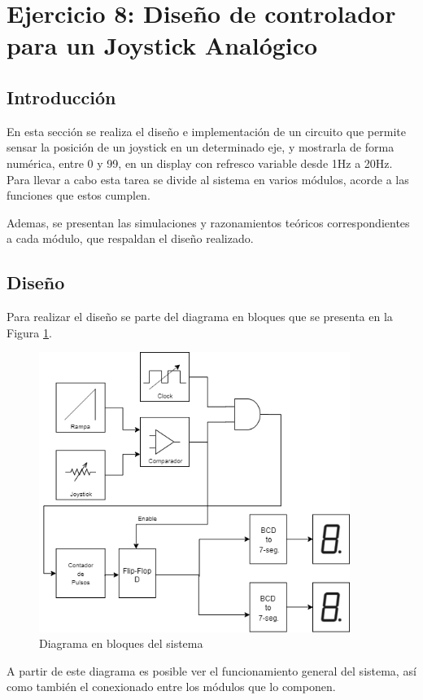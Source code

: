 
\section{Ejercicio 8: Dise\~no de controlador para un Joystick Anal\'ogico}\subsection{Introducci\'on}
En esta secci\'on se realiza el dise\~no e implementaci\'on de un circuito que permite sensar la posici\'on de un joystick en un determinado eje, y mostrarla de forma num\'erica, entre 0 y 99, en un display con refresco variable desde 1Hz a 20Hz. Para llevar a cabo esta tarea se divide al sistema en varios m\'odulos, acorde a las funciones que estos cumplen.

Ademas, se presentan las simulaciones y razonamientos te\'oricos correspondientes a cada m\'odulo, que respaldan el dise\~no realizado.

\subsection{Dise\~no}
Para realizar el dise\~no se parte del diagrama en bloques que se presenta en la Figura \ref{fig:BLOCK_DIAG}. 
\begin{figure}[H]
    \centering
    \includegraphics[width=0.9\textwidth]{../EJ8/Recursos/flowDiagram.png}
    \caption{Diagrama en bloques del sistema}
    \label{fig:BLOCK_DIAG}
\end{figure}
A partir de este diagrama es posible ver el funcionamiento general del sistema, as\'i como tambi\'en el conexionado entre los m\'odulos que lo componen.

